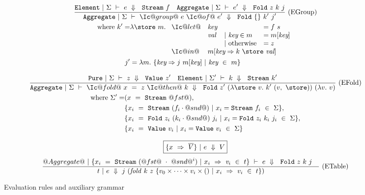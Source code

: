 \begin{figure*}
\begin{gather*}
\ruleIN
{
  \SourceStepXE{\Sigma}{e}{\VStream{f}}
  \quad
  \SourceStepXA{\Sigma}{e'}{\VFold{z}{k}{j}}
}
{
  \SourceStepXA{\Sigma}
    {\Ic@group@~e~\Ic@of@~e'}
    {\VFold
      {\{\}}
      {k'}
      {j'}}
}{EGroup}
\\
\begin{aligned}
\mbox{where }
k' = & \lam{\store~m}
\begin{array}[t]{llll}
 \Ic@let@&\ti{key}&& = f~s \\
         &\ti{val}&|~ \ti{key} \in m & = m[\ti{key}] \\
             &&|~ \mbox{otherwise} & = z \\
  \Ic@in@&\multicolumn{3}{l}{m[\ti{key} \Rightarrow k~\store~\ti{val}]}
\end{array}
\\
j' & = \lam{m}
        \{\ti{key} \Rightarrow j~m[\ti{key}]~|~\ti{key}~\in~m\}
\end{aligned}
\end{gather*}

\begin{gather*}
\ruleIN
{
  \SourceStepXP{\Sigma}{z}{\VValue{z'}}
  \quad
  \SourceStepXE{\Sigma'}{k}{\VStream{k'}}
}
{
  \SourceStepXA{\Sigma}
    {\Ic@fold@~x~=~z~\Ic@then@~k}
    {\VFold
      {z'}
      {(\lam{\store~v} k'~(v,~\store))}
      {(\lam{v} v)}}
}{EFold}
 \\
\begin{aligned}
  \mbox{where } \Sigma' = &
    (x~=~\VStream{@fst@}),
\\ & \{x_i~=~\VStream{(f_i \cdot @snd@)}~|~x_i=\VStream{f_i}~\in~\Sigma\},
\\ & \{x_i~=~\VFold{z_i}{(k_i \cdot @snd@)}{j_i}~|~x_i=\VFold{z_i}{k_i}{j_i}~\in~\Sigma\},
\\ & \{x_i~=~\VValue{v_i}~|~x_i=\VValue{v_i}~\in~\Sigma\}
\end{aligned}
\end{gather*}

$$
\boxed{\{x~\Rightarrow~\overline{V}\}~|~e~\Downarrow~V}
$$
$$
\enskip \frac {\displaystyle 
  @Aggregate@~|~\{x_i~=~\texttt{Stream}~(@fst@~\cdot~@snd@^i)~|~x_i~\Rightarrow~\mathit{v}_i~\in~t\}~\vdash~e~\Downarrow~~\texttt{Fold}~z~k~j
  \quad
} {\displaystyle 
  t~|~e~\Downarrow~
  j~(\mathit{fold}~k~z~\{v_0 \times \cdots \times v_i \times ()~|~x_i~\Rightarrow~v_i~\in~t\})
} \  \mbox{(ETable)} \enskip
$$

\caption{Evaluation rules and auxiliary grammar}
\label{icicle:fig:source:eval}
\end{figure*}


